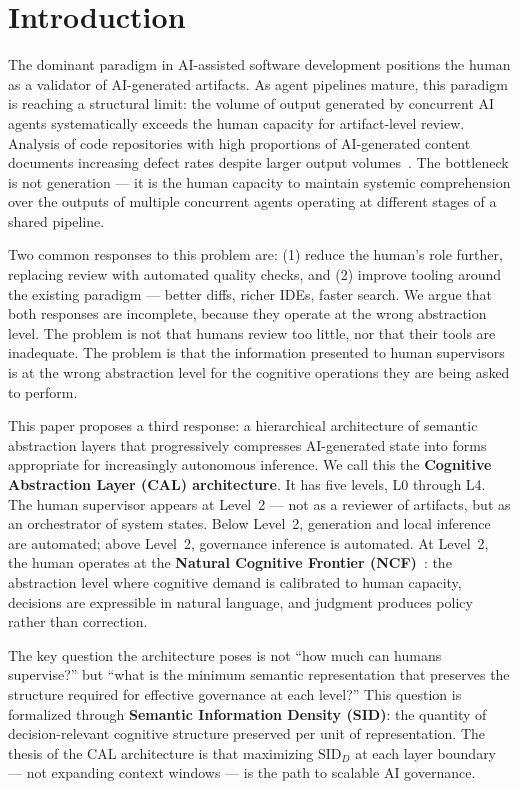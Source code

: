 \documentclass[11pt]{article}
\theoremstyle{definition}
\theoremstyle{remark}
\begin{document}
\section{Introduction}

The dominant paradigm in AI-assisted software development positions
the human as a validator of AI-generated artifacts. As agent
pipelines mature, this paradigm is reaching a structural limit: the
volume of output generated by concurrent AI agents systematically
exceeds the human capacity for artifact-level review. Analysis of
code repositories with high proportions of AI-generated content
documents increasing defect rates despite larger output
volumes~\cite{gitclear2025}. The bottleneck is not generation --- it
is the human capacity to maintain systemic comprehension over the
outputs of multiple concurrent agents operating at different stages
of a shared pipeline.

Two common responses to this problem are: (1) reduce the human's
role further, replacing review with automated quality checks, and
(2) improve tooling around the existing paradigm --- better diffs,
richer IDEs, faster search. We argue that both responses are
incomplete, because they operate at the wrong abstraction level. The
problem is not that humans review too little, nor that their tools
are inadequate. The problem is that the information presented to
human supervisors is at the wrong abstraction level for the
cognitive operations they are being asked to perform.

This paper proposes a third response: a hierarchical architecture of
semantic abstraction layers that progressively compresses
AI-generated state into forms appropriate for increasingly autonomous
inference. We call this the \textbf{Cognitive Abstraction Layer
(CAL) architecture}. It has five levels, L0 through L4. The human
supervisor appears at Level~2 --- not as a reviewer of artifacts,
but as an orchestrator of system states. Below Level~2, generation
and local inference are automated; above Level~2, governance
inference is automated. At Level~2, the human operates at the
\textbf{Natural Cognitive Frontier (NCF)}~\cite{chancay2026tco}:
the abstraction level where cognitive demand is calibrated to human
capacity, decisions are expressible in natural language, and
judgment produces policy rather than correction.

The key question the architecture poses is not ``how much can humans
supervise?'' but ``what is the minimum semantic representation that
preserves the structure required for effective governance at each
level?'' This question is formalized through
\textbf{Semantic Information Density (SID)}: the quantity of
decision-relevant cognitive structure preserved per unit of
representation. The thesis of the CAL architecture is that
maximizing $\text{SID}_D$ at each layer boundary --- not expanding
context windows --- is the path to scalable AI governance.
\end{document}
